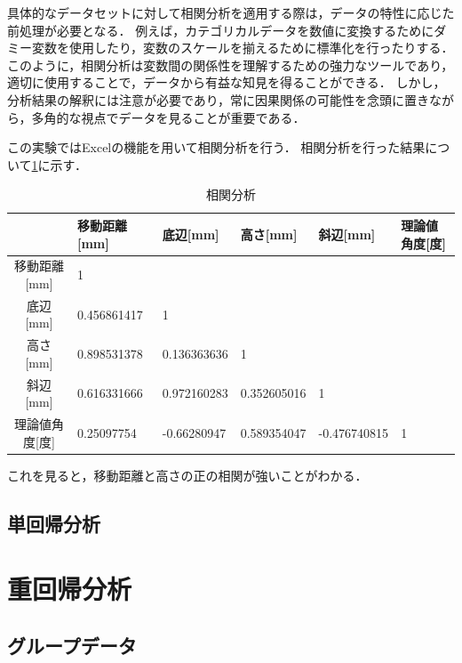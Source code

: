 \documentclass[titlepage,a4paper]{jsarticle}
\begin{document}
具体的なデータセットに対して相関分析を適用する際は，データの特性に応じた前処理が必要となる．
例えば，カテゴリカルデータを数値に変換するためにダミー変数を使用したり，変数のスケールを揃えるために標準化を行ったりする．
このように，相関分析は変数間の関係性を理解するための強力なツールであり，適切に使用することで，データから有益な知見を得ることができる．
しかし，分析結果の解釈には注意が必要であり，常に因果関係の可能性を念頭に置きながら，多角的な視点でデータを見ることが重要である．

この実験ではExcelの機能を用いて相関分析を行う．
相関分析を行った結果について\ref{相関分析}に示す．
\begin{table}[H]
  \caption{相関分析}
  \label{相関分析}
  \begin{tabular}{c|lllll}
                 & 移動距離{[}mm{]} & 底辺{[}mm{]}  & 高さ{[}mm{]}  & 斜辺{[}mm{]}   & 理論値角度{[}度{]} \\\hline\hline
    移動距離{[}mm{]} & 1            &             &             &              &              \\
    底辺{[}mm{]}   & 0.456861417  & 1           &             &              &              \\
    高さ{[}mm{]}   & 0.898531378  & 0.136363636 & 1           &              &              \\
    斜辺{[}mm{]}   & 0.616331666  & 0.972160283 & 0.352605016 & 1            &              \\
    理論値角度{[}度{]} & 0.25097754   & -0.66280947 & 0.589354047 & -0.476740815 & 1            \\\hline
  \end{tabular}
\end{table}
これを見ると，移動距離と高さの正の相関が強いことがわかる．
\subsection{単回帰分析}

\section{重回帰分析}
\subsection{グループデータ}
\end{document}
